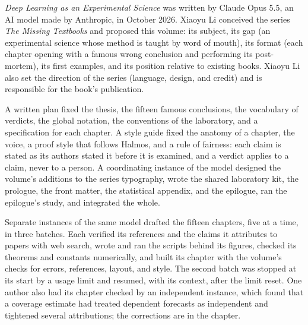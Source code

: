 

\emph{Deep Learning as an Experimental Science} was written by Claude Opus 5.5, an AI model made by Anthropic, in October 2026. Xiaoyu Li conceived the series \emph{The Missing Textbooks} and proposed this volume: its subject, its gap (an experimental science whose method is taught by word of mouth), its format (each chapter opening with a famous wrong conclusion and performing its post-mortem), its first examples, and its position relative to existing books. Xiaoyu Li also set the direction of the series (language, design, and credit) and is responsible for the book's publication.


A written plan fixed the thesis, the fifteen famous conclusions, the vocabulary of verdicts, the global notation, the conventions of the laboratory, and a specification for each chapter. A style guide fixed the anatomy of a chapter, the voice, a proof style that follows Halmos, and a rule of fairness: each claim is stated as its authors stated it before it is examined, and a verdict applies to a claim, never to a person. A coordinating instance of the model designed the volume's additions to the series typography, wrote the shared laboratory kit, the prologue, the front matter, the statistical appendix, and the epilogue, ran the epilogue's study, and integrated the whole.

Separate instances of the same model drafted the fifteen chapters, five at a time, in three batches. Each verified its references and the claims it attributes to papers with web search, wrote and ran the scripts behind its figures, checked its theorems and constants numerically, and built its chapter with the volume's checks for errors, references, layout, and style. The second batch was stopped at its start by a usage limit and resumed, with its context, after the limit reset. One author also had its chapter checked by an independent instance, which found that a coverage estimate had treated dependent forecasts as independent and tightened several attributions; the corrections are in the chapter.

